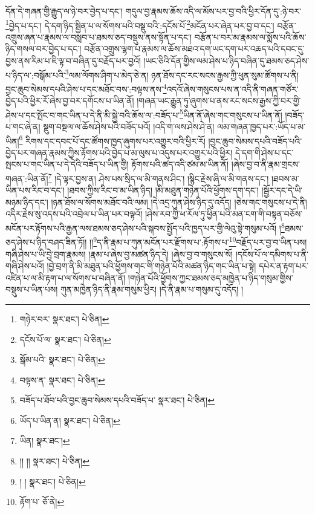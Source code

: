 དོན་དེ་གཞན་གྱི་རྒྱུད་ལ་ཉེ་བར་བྱེད་པ་དང་། གདུལ་བྱ་རྣམས་ཆོས་འདི་ལ་མོས་པར་བྱ་བའི་ཕྱིར་དོན་དུ་:ཉེ་བར་\footnote{གཉེར་བར་  སྣར་ཐང་།  པེ་ཅིན། }བྱེད་པ་དང་། དེ་དག་ཉིད་སྦྱིན་པ་ལ་སོགས་པའི་བསྡུ་བའི་:དངོས་པོ་\footnote{དངོས་པོ་ལ་  སྣར་ཐང་།  པེ་ཅིན། }མངོན་པར་ཞེན་པར་བྱ་བ་དང་། བརྩོན་འགྲུས་ཞན་པ་རྣམས་ལ་བསླབ་པ་ཐམས་ཅད་བསྡུས་ནས་སྟོན་པ་དང་། བརྩོན་པ་བར་མ་རྣམས་ལ་སྨོས་པའི་ཆོས་ཉིད་གསལ་བར་བྱེད་པ་དང་། བརྩོན་འགྲུས་ལྷག་པ་རྣམས་ལ་ཆོས་མཐའ་དག་ཡང་དག་པར་འཆད་པའི་དབང་དུ་བྱས་ནས་རིམ་པ་ཇི་ལྟ་བ་བཞིན་དུ་བརྗོད་པར་བྱའོ། །ཡང་ཅིའི་དོན་གྱིས་ལམ་ཤེས་པ་ཉིད་བཞིན་དུ་ཐམས་ཅད་ཤེས་པ་ཉིད་ལ་:བསྒོམ་པའི་\footnote{སྒོམ་པའི་  སྣར་ཐང་།  པེ་ཅིན། }ལམ་ལོགས་ཤིག་པ་མེད་ཅེ་ན། ཉན་ཐོས་དང་རང་སངས་རྒྱས་ཀྱི་ཕུན་སུམ་ཚོགས་པ་ནི། བྱང་ཆུབ་སེམས་དཔའི་ཤེས་པ་དང་མཐོང་བས་:བལྟས་ནས་\footnote{བལྟས་ན་  སྣར་ཐང་།  པེ་ཅིན། }འདའོ་ཞེས་གསུངས་པས་ན་འདི་ནི་གཞན་གཙོར་བྱེད་པའི་ཕྱིར་རོ་ཞེས་བྱ་བར་དགོངས་པ་ཡིན་ནོ། །གཞན་ཡང་རྒྱུན་ཏུ་ཞུགས་པ་ནས་རང་སངས་རྒྱས་ཀྱི་བར་གྱི་ཤེས་པ་དང་སྤོང་བ་གང་ཡིན་པ་དེ་ནི་མི་སྐྱེ་བའི་ཆོས་ལ་:བཟོད་པ་\footnote{བཟོད་པ་ཐོབ་པའི་བྱང་ཆུབ་སེམས་དཔའི་བཟོད་པ་  སྣར་ཐང་།  པེ་ཅིན། }ཡིན་ནོ་ཞེས་གང་གསུངས་པ་ཡིན་ནོ། །བཟོད་པ་གང་ཞེ་ན། སྡུག་བསྔལ་ལ་ཆོས་ཤེས་པའི་བཟོད་པའོ། །འདི་ག་ལས་ཤེས་ཤེ་ན། ལམ་གཞན་ཁྱད་པར་:ཡོད་པ་མ་ཡིན།\footnote{ཡོད་པ་ཡིན་ན།  སྣར་ཐང་།  པེ་ཅིན། } རིགས་དང་དབང་པོ་དང་ཚོགས་ཁྱད་ཞུགས་པར་འགྱུར་བའི་ཕྱིར་རོ། །བྱང་ཆུབ་སེམས་དཔའི་བཟོད་པའི་བྱེད་པར་གཞན་རྣམས་ཀྱིས་རྟོགས་པའི་བྱེད་པ་མ་ལུས་པ་འདུས་པར་འགྱུར་པའི་ཕྱིར། དེ་དག་གི་ཤེས་པ་དང་སྤངས་པ་གང་ཡིན་པ་དེ་དེའི་བཟོད་པ་ཡིན་གྱི། རྟོགས་པའི་ཚད་འདི་ཙམ་མ་ཡིན་ནོ། །ཞེས་བྱ་བ་ནི་རྣམ་གྲངས་གཞན་:ཡིན་ནོ།\footnote{ཡིན།  སྣར་ཐང་། } །དེ་ལྟར་བྱས་ན། ཤེས་པས་སྲིད་ལ་མི་གནས་ཤིང་། །སྙིང་རྗེས་ཞི་ལ་མི་གནས་དང་། །ཐབས་མ་ཡིན་པས་རིང་བ་དང་། །ཐབས་ཀྱིས་རིང་བ་མ་ཡིན་ཉིད། །མི་མཐུན་གཉེན་པོའི་ཕྱོགས་དག་དང་། །སྦྱོར་དང་དེ་ཡི་མཉམ་ཉིད་དང་། །ཉན་ཐོས་ལ་སོགས་མཐོང་བའི་ལམ། །དེ་འདྲ་ཀུན་ཤེས་ཉིད་དུ་འདོད། །ཅེས་གང་གསུངས་པ་དེ་ནི། འདིར་རྗེས་སུ་འདས་པའི་འབྲེལ་པ་ཡིན་པར་བལྟའོ། །ཤེས་རབ་ཀྱི་ཕ་རོལ་ཏུ་ཕྱིན་པའི་མན་ངག་གི་བསྟན་བཅོས་མངོན་པར་རྟོགས་པའི་རྒྱན་ལས་ཐམས་ཅད་ཤེས་པའི་སྐབས་སྤྱོད་པའི་ཁྱད་པར་གྱི་ལེའུ་སྟེ་གསུམ་པའོ། །\footnote{།། །།  སྣར་ཐང་།  པེ་ཅིན། }ཐམས་ཅད་ཤེས་པ་ཉིད་བཤད་ཟིན་ཏོ།། །།\footnote{། །  སྣར་ཐང་།  པེ་ཅིན། }ད་ནི་རྣམ་པ་ཀུན་མངོན་པར་རྫོགས་པ་:རྟོགས་པ་\footnote{རྟོག་པ་  ཅོ་ནེ། }བརྗོད་པར་བྱ་བ་ཡིན་པས། གཞི་ཤེས་པ་ཡི་བྱེ་བྲག་རྣམས། །རྣམ་པ་ཞེས་བྱ་མཚན་ཉིད་དེ། །ཞེས་བྱ་བ་གསུངས་སོ། །དངོས་པོ་ལ་དམིགས་པ་ནི་གཞི་ཤེས་པའོ། །བྱེ་བྲག་ནི་མི་མཐུན་པའི་ཕྱོགས་གང་གི་གཉེན་པོའི་མཚན་ཉིད་གང་ཡིན་པ་སྟེ། དཔེར་ན་རྟག་པར་འཛིན་པ་ལ་མི་རྟག་པ་ལ་སོགས་པ་བཞིན་ནོ། །གཉེན་པོའི་ཕྱོགས་ཀྱང་ཐམས་ཅད་མཁྱེན་པ་ཉིད་གསུམ་གྱིས་བསྡུས་པ་ཡིན་པས། ཀུན་མཁྱེན་ཉིད་ནི་རྣམ་གསུམ་ཕྱིར། །དེ་ནི་རྣམ་པ་གསུམ་དུ་འདོད། །
